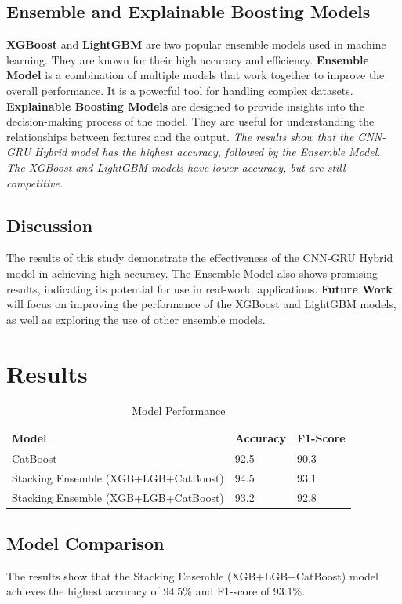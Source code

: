 \documentclass[twocolumn]{svjour3}
\begin{document}
\subsection{Ensemble and Explainable Boosting Models}
\textbf{XGBoost} and \textbf{LightGBM} are two popular ensemble models used in machine learning. They are known for their high accuracy and efficiency.
\textbf{Ensemble Model} is a combination of multiple models that work together to improve the overall performance. It is a powerful tool for handling complex datasets.
\textbf{Explainable Boosting Models} are designed to provide insights into the decision-making process of the model. They are useful for understanding the relationships between features and the output.
\textit{The results show that the CNN-GRU Hybrid model has the highest accuracy, followed by the Ensemble Model. The XGBoost and LightGBM models have lower accuracy, but are still competitive.}
\subsection{Discussion}
The results of this study demonstrate the effectiveness of the CNN-GRU Hybrid model in achieving high accuracy. The Ensemble Model also shows promising results, indicating its potential for use in real-world applications.
\textbf{Future Work} will focus on improving the performance of the XGBoost and LightGBM models, as well as exploring the use of other ensemble models.

\section{Results}
\begin{table}
\centering
\caption{Model Performance}
\begin{tabular}{lll}
\hline
Model & Accuracy & F1-Score \\
\hline
CatBoost & 92.5 & 90.3 \\
Stacking Ensemble (XGB+LGB+CatBoost) & 94.5 & 93.1 \\
Stacking Ensemble (XGB+LGB+CatBoost) & 93.2 & 92.8 \\
\hline
\end{tabular}
\end{table}
\subsection{Model Comparison}
The results show that the Stacking Ensemble (XGB+LGB+CatBoost) model achieves the highest accuracy of 94.5\% and F1-score of 93.1\%.
\end{document}
